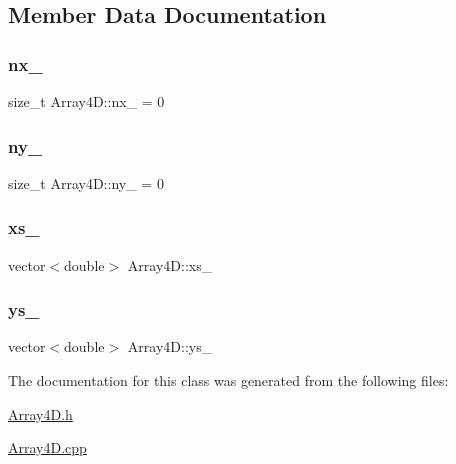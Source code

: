 \subsection{Member Data Documentation}
\mbox{\label{class_array4_d_a5fa707d43fe236f8890dae010de99bf1}} 
\subsubsection{\texorpdfstring{nx\+\_\+}{nx\_}}
{\footnotesize\ttfamily size\+\_\+t Array4\+D\+::nx\+\_\+ = 0\hspace{0.3cm}{\ttfamily [protected]}}

\mbox{\label{class_array4_d_a0c3053b1362730bb52d2d6e9c4402099}} 
\subsubsection{\texorpdfstring{ny\+\_\+}{ny\_}}
{\footnotesize\ttfamily size\+\_\+t Array4\+D\+::ny\+\_\+ = 0\hspace{0.3cm}{\ttfamily [protected]}}

\mbox{\label{class_array4_d_ae6500ac112b7aa10fbea84bf32950409}} 
\subsubsection{\texorpdfstring{xs\+\_\+}{xs\_}}
{\footnotesize\ttfamily vector$<$double$>$ Array4\+D\+::xs\+\_\+\hspace{0.3cm}{\ttfamily [protected]}}

\mbox{\label{class_array4_d_a9131d4bdbbbdb871cc7f0a50902014b5}} 
\subsubsection{\texorpdfstring{ys\+\_\+}{ys\_}}
{\footnotesize\ttfamily vector$<$double$>$ Array4\+D\+::ys\+\_\+\hspace{0.3cm}{\ttfamily [protected]}}



The documentation for this class was generated from the following files\+:\begin{DoxyCompactItemize}
\item 
\mbox{\hyperlink{_array4_d_8h}{Array4\+D.\+h}}\item 
\mbox{\hyperlink{_array4_d_8cpp}{Array4\+D.\+cpp}}\end{DoxyCompactItemize}
